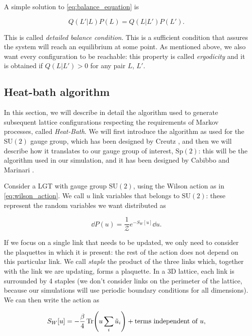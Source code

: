 \documentclass[reqno,12pt]{article}
\numberwithin{equation}{section}
\newcommand{\Z}{\mathcal{Z}}
\newcommand{\SU}{\mathrm{SU}}
\newcommand{\Sp}{\mathrm{Sp}}
\begin{document}
A simple solution to \eqref{eq:balance_equation} is

\begin{equation} \label{eq:detailed_balance_condition}
	Q(L'| L) P(L) = Q(L| L') P(L').
\end{equation}

This is called \textit{detailed balance condition}. This is a sufficient condition that assures the system will
reach an equilibrium at some point. As mentioned above, we also want every configuration to be reachable: this property
is called \textit{ergodicity} and it is obtained if $Q(L|L') > 0$ for any pair $L$, $L'$.

\subsection{Heat-bath algorithm} \label{heatbath}

In this section, we will describe in detail the algorithm used to generate subsequent lattice configurations respecting
the requirements of Markov processes, called \textit{Heat-Bath}. 
We will first introduce the algorithm as used for the $\SU(2)$ gauge group,
which has been designed by Creutz \cite{creutz}, and then we will describe 
how it translates to our gauge group of interest, $\Sp(2)$: this will be the algorithm used in our
simulation, and it has been designed by Cabibbo and Marinari \cite{cabibbo}.

Consider a LGT with gauge group $\SU(2)$, using the Wilson action as in \eqref{eq:wilson_action}. We call $u$
link variables that belongs to $\SU(2)$: these represent the random variables we want distributed as

\begin{equation} \label{eq:u_probdist}
	\dd{P(u)} = \frac{1}{\Z} e^{-S_W[u]} \dd{u}.
\end{equation}

If we focus on a single link that needs to be updated, we only need to consider the plaquettes in which it is
present: the rest of the action does not depend on this particular link. We call \textit{staple} the product
of the three links which, together with the link we are updating, forms a plaquette. In a 3D lattice, each link
is surrounded by 4 staples (we don't consider links on the perimeter of the lattice, because our simulations will 
use periodic boundary conditions for all dimensions). We can then write the action as

\begin{equation} \label{eq:heatbath_wilson_action_su2}
	S_W[u] = -\frac{\beta}{4} \Tr(u \sum_i \tilde{u}_i) + \text{terms independent of } u,
\end{equation}
\end{document}
